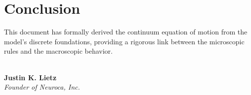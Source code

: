 \documentclass[11pt, letterpaper]{article}
\begin{document}
\section{Conclusion}
\lipsum[3] %
This document has formally derived the continuum equation of motion from the model's discrete foundations, providing a rigorous link between the microscopic rules and the macroscopic behavior.

\vspace{2cm} %

\noindent %
\begin{minipage}{0.5\linewidth}
    \hrulefill \\ %
    \vspace{0.5em}
    \noindent \textbf{Justin K. Lietz} \\
    \textit{Founder of Neuroca, Inc.}
\end{minipage}
\end{document}
